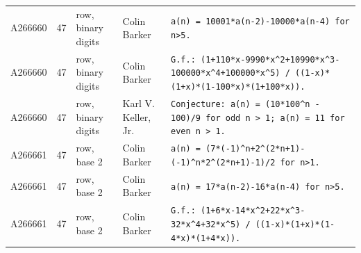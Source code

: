 \documentclass[11pt]{article}
\theoremstyle{definition}
\theoremstyle{remark}
\begin{document}
{\begin{longtable}{p{1.3cm}p{0.7cm}p{2.4cm}p{2.3cm}p{7.3cm}}
A266660 & 47 & row, binary digits & Colin Barker & \texttt{a(n)\allowbreak{} \allowbreak{}=\allowbreak{} \allowbreak{}10001*\allowbreak{}a(n-\allowbreak{}2)\allowbreak{}-\allowbreak{}10000*\allowbreak{}a(n-\allowbreak{}4)\allowbreak{} \allowbreak{}for \allowbreak{}n>5.} \\
A266660 & 47 & row, binary digits & Colin Barker & \texttt{G.f.: \allowbreak{}(1+\allowbreak{}110*\allowbreak{}x-\allowbreak{}9990*\allowbreak{}x\^{}2+\allowbreak{}10990*\allowbreak{}x\^{}3-\allowbreak{}100000*\allowbreak{}x\^{}4+\allowbreak{}100000*\allowbreak{}x\^{}5)\allowbreak{} \allowbreak{}/\allowbreak{} \allowbreak{}((1-\allowbreak{}x)\allowbreak{}*\allowbreak{}(1+\allowbreak{}x)\allowbreak{}*\allowbreak{}(1-\allowbreak{}100*\allowbreak{}x)\allowbreak{}*\allowbreak{}(1+\allowbreak{}100*\allowbreak{}x)\allowbreak{})\allowbreak{}.} \\
A266660 & 47 & row, binary digits & Karl V. Keller, Jr. & \texttt{Conjecture: \allowbreak{}a(n)\allowbreak{} \allowbreak{}=\allowbreak{} \allowbreak{}(10*\allowbreak{}100\^{}n \allowbreak{}-\allowbreak{} \allowbreak{}100)\allowbreak{}/\allowbreak{}9 \allowbreak{}for \allowbreak{}odd \allowbreak{}n \allowbreak{}> \allowbreak{}1; \allowbreak{}a(n)\allowbreak{} \allowbreak{}=\allowbreak{} \allowbreak{}11 \allowbreak{}for \allowbreak{}even \allowbreak{}n \allowbreak{}> \allowbreak{}1.} \\
A266661 & 47 & row, base 2 & Colin Barker & \texttt{a(n)\allowbreak{} \allowbreak{}=\allowbreak{} \allowbreak{}(7*\allowbreak{}(-\allowbreak{}1)\allowbreak{}\^{}n+\allowbreak{}2\^{}(2*\allowbreak{}n+\allowbreak{}1)\allowbreak{}-\allowbreak{}(-\allowbreak{}1)\allowbreak{}\^{}n*\allowbreak{}2\^{}(2*\allowbreak{}n+\allowbreak{}1)\allowbreak{}-\allowbreak{}1)\allowbreak{}/\allowbreak{}2 \allowbreak{}for \allowbreak{}n>1.} \\
A266661 & 47 & row, base 2 & Colin Barker & \texttt{a(n)\allowbreak{} \allowbreak{}=\allowbreak{} \allowbreak{}17*\allowbreak{}a(n-\allowbreak{}2)\allowbreak{}-\allowbreak{}16*\allowbreak{}a(n-\allowbreak{}4)\allowbreak{} \allowbreak{}for \allowbreak{}n>5.} \\
A266661 & 47 & row, base 2 & Colin Barker & \texttt{G.f.: \allowbreak{}(1+\allowbreak{}6*\allowbreak{}x-\allowbreak{}14*\allowbreak{}x\^{}2+\allowbreak{}22*\allowbreak{}x\^{}3-\allowbreak{}32*\allowbreak{}x\^{}4+\allowbreak{}32*\allowbreak{}x\^{}5)\allowbreak{} \allowbreak{}/\allowbreak{} \allowbreak{}((1-\allowbreak{}x)\allowbreak{}*\allowbreak{}(1+\allowbreak{}x)\allowbreak{}*\allowbreak{}(1-\allowbreak{}4*\allowbreak{}x)\allowbreak{}*\allowbreak{}(1+\allowbreak{}4*\allowbreak{}x)\allowbreak{})\allowbreak{}.} \\

\end{longtable}}
\end{document}
